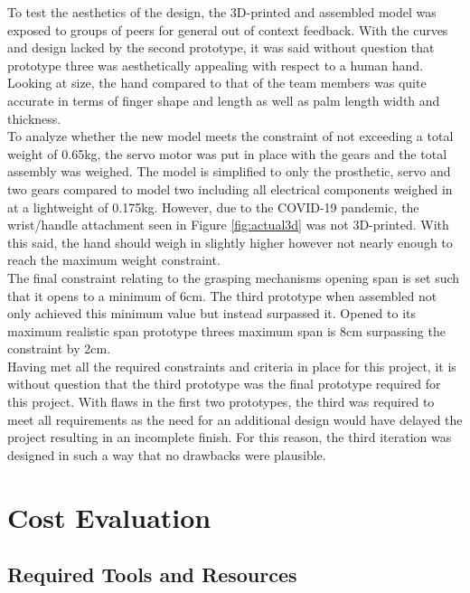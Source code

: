 \documentclass[11.5pt]{article}
\begin{document}
To test the aesthetics of the design, the 3D-printed and assembled model was exposed to groups of peers for general out of context feedback. With the curves and design lacked by the second prototype, it was said without question that prototype three was aesthetically appealing with respect to a human hand. Looking at size, the hand compared to that of the team members was quite accurate in terms of finger shape and length as well as palm length width and thickness.\\

To analyze whether the new model meets the constraint of not exceeding a total weight of 0.65kg, the servo motor was put in place with the gears and the total assembly was weighed. The model is simplified to only the prosthetic, servo and two gears compared to model two including all electrical components weighed in at a lightweight of 0.175kg.  However, due to the COVID-19 pandemic, the wrist/handle attachment seen in Figure \ref{fig:actual3d} was not 3D-printed. With this said, the hand should weigh in slightly higher however not nearly enough to reach the maximum weight constraint.\\ 

The final constraint relating to the grasping mechanisms opening span is set such that it opens to a minimum of 6cm. The third prototype when assembled not only achieved this minimum value but instead surpassed it. Opened to its maximum realistic span prototype threes maximum span is 8cm surpassing the constraint by 2cm.\\

Having met all the required constraints and criteria in place for this project, it is without question that the third prototype was the final prototype required for this project. With flaws in the first two prototypes, the third was required to meet all requirements as the need for an additional design would have delayed the project resulting in an incomplete finish. For this reason, the third iteration was designed in such a way that no drawbacks were plausible.

\newpage

\section{Cost Evaluation}
\subsection{Required Tools and Resources}
\end{document}
